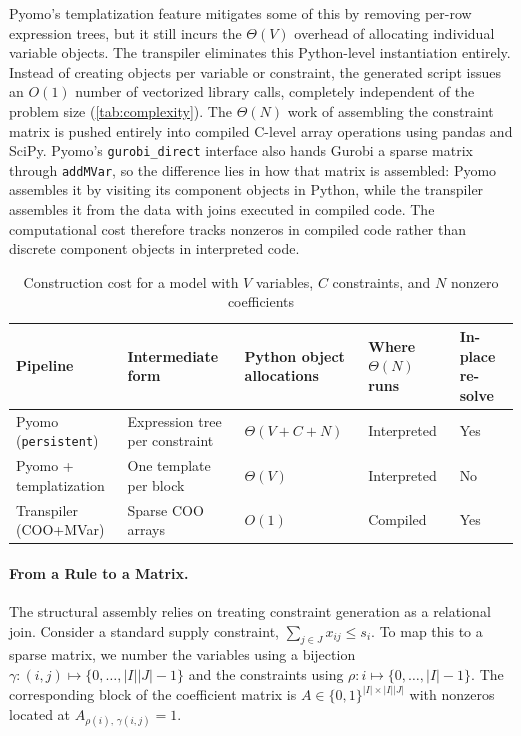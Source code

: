 \documentclass[runningheads]{llncs}
\begin{document}
Pyomo's templatization feature mitigates some of this by removing per-row expression trees, but it still incurs the $\Theta(V)$ overhead of allocating individual variable objects. The transpiler eliminates this Python-level instantiation entirely. Instead of creating objects per variable or constraint, the generated script issues an $O(1)$ number of vectorized library calls, completely independent of the problem size (\autoref{tab:complexity}). The $\Theta(N)$ work of assembling the constraint matrix is pushed entirely into compiled C-level array operations using pandas and SciPy. Pyomo's \texttt{gurobi\_direct} interface also hands Gurobi a sparse matrix through \texttt{addMVar}, so the difference lies in how that matrix is assembled: Pyomo assembles it by visiting its component objects in Python, while the transpiler assembles it from the data with joins executed in compiled code. The computational cost therefore tracks nonzeros in compiled code rather than discrete component objects in interpreted code.

\begin{table}[tb]
\centering
\caption{Construction cost for a model with $V$ variables, $C$ constraints, and $N$ nonzero coefficients}
\label{tab:complexity}
\footnotesize
\begin{tabular}{@{} >{\raggedright\arraybackslash}p{}
                    >{\raggedright\arraybackslash}p{}
                    >{\raggedright\arraybackslash}p{}
                    >{\raggedright\arraybackslash}p{}
                    >{\raggedright\arraybackslash}p{} @{}}
\toprule
\textbf{Pipeline} & \textbf{Intermediate form} & \textbf{Python object allocations} & \textbf{Where $\Theta(N)$ runs} & \textbf{In-place re-solve} \\
\midrule
Pyomo (\texttt{persistent}) & Expression tree per constraint & $\Theta(V + C + N)$ & Interpreted & Yes \\
Pyomo + templatization & One template per block & $\Theta(V)$ & Interpreted & No \\
Transpiler (COO+MVar) & Sparse COO arrays & $O(1)$ & Compiled & Yes \\
\bottomrule
\end{tabular}
\end{table}

\paragraph{From a Rule to a Matrix.} The structural assembly relies on treating constraint generation as a relational join. Consider a standard supply constraint, $\sum_{j \in J} x_{ij} \le s_i$. To map this to a sparse matrix, we number the variables using a bijection $\gamma:(i,j)\mapsto\{0,\dots,|I||J|-1\}$ and the constraints using $\rho:i\mapsto\{0,\dots,|I|-1\}$. The corresponding block of the coefficient matrix is $A\in\{0,1\}^{|I|\times|I||J|}$ with nonzeros located at $A_{\rho(i),\,\gamma(i,j)}=1$. 
\end{document}
